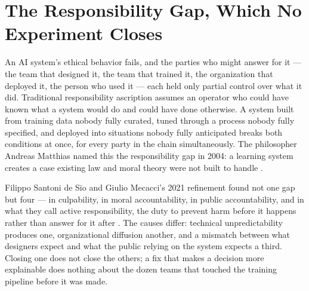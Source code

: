 \section{The Responsibility Gap, Which No Experiment Closes}
\label{sec:experiment-closes}
An AI system's ethical behavior fails, and the parties who might answer for it — the team that designed it, the team that trained it, the organization that deployed it, the person who used it — each held only partial control over what it did. Traditional responsibility ascription assumes an operator who could have known what a system would do and could have done otherwise. A system built from training data nobody fully curated, tuned through a process nobody fully specified, and deployed into situations nobody fully anticipated breaks both conditions at once, for every party in the chain simultaneously. The philosopher Andreas Matthias named this the responsibility gap in 2004: a learning system creates a case existing law and moral theory were not
built to handle \autocite{matthias2004responsibility}.

Filippo Santoni de Sio and Giulio Mecacci's 2021 refinement found not one gap but four — in culpability, in moral accountability, in public accountability, and in what they call active responsibility, the duty to prevent harm before it happens rather than answer for it after \autocite{santonidesio2021four}. The causes differ: technical unpredictability produces one, organizational diffusion another, and a mismatch between what designers expect and what the public relying on the system expects a third. Closing one does not close the others; a fix that makes a decision more explainable does nothing about the dozen teams that touched the training pipeline before it was made.

